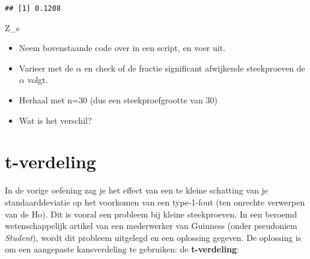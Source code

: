 \documentclass[]{book}
\newenvironment{Shaded}{\begin{snugshade}}{\end{snugshade}}
\newcommand{\KeywordTok}[1]{\textcolor[rgb]{0.13,0.29,0.53}{\textbf{{#1}}}}
\newcommand{\DataTypeTok}[1]{\textcolor[rgb]{0.13,0.29,0.53}{{#1}}}
\newcommand{\DecValTok}[1]{\textcolor[rgb]{0.00,0.00,0.81}{{#1}}}
\newcommand{\FloatTok}[1]{\textcolor[rgb]{0.00,0.00,0.81}{{#1}}}
\newcommand{\StringTok}[1]{\textcolor[rgb]{0.31,0.60,0.02}{{#1}}}
\newcommand{\CommentTok}[1]{\textcolor[rgb]{0.56,0.35,0.01}{\textit{{#1}}}}
\newcommand{\NormalTok}[1]{{#1}}
\providecommand{\tightlist}{%
  \setlength{\itemsep}{0pt}\setlength{\parskip}{0pt}}
\theoremstyle{definition}
\theoremstyle{definition}
\theoremstyle{definition}
\theoremstyle{remark}
\let\BeginKnitrBlock\begin \let\EndKnitrBlock\end
\begin{document}
\begin{Shaded}
\end{Shaded}

\begin{verbatim}
## [1] 0.1208
\end{verbatim}

\BeginKnitrBlock{exercise}
\protect\hypertarget{exr:zstschat}{}{\label{exr:zstschat} }Z\_s

\begin{itemize}
\tightlist
\item
  Neem bovenstaande code over in een script, en voer uit.
\item
  Varieer met de \(\alpha\) en check of de fractie significant
  afwijkende steekproeven de \(\alpha\) volgt.
\item
  Herhaal met n=30 (dus een steekproefgrootte van 30)
\item
  Wat is het verschil?
\end{itemize}
\EndKnitrBlock{exercise}

\section{t-verdeling}\label{t-verdeling}

In de vorige oefening zag je het effect van een te kleine schatting van
je standaarddeviatie op het voorkomen van een type-1-fout (ten onrechte
verwerpen van de Ho). Dit is vooral een probleem bij kleine
steekproeven. In een beroemd wetenschappelijk artikel van een
mederwerker van Guinness (onder pseudoniem \emph{Student}), wordt dit
probleem uitgelegd en een oplossing gegeven. De oplossing is om een
aangepaste kansverdeling te gebruiken: de \textbf{t-verdeling}:
\end{document}
